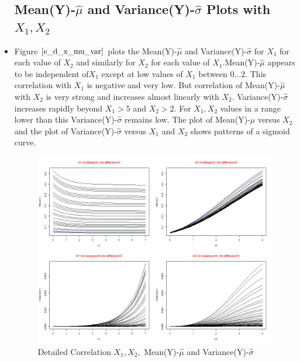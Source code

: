 \documentclass[twoside,12pt]{article}
\begin{document}
\begin{itemize}
\FloatBarrier
\subsection{Mean(Y)-$\hat{\mu}$ and Variance(Y)-$\hat{\sigma}$ Plots with $X_1,X_2$}
\item
Figure $\eqref{e_d_x_mu_var}$ plots the Mean(Y)-$\hat{\mu}$ and Variance(Y)-$\hat{\sigma}$ for $X_1$ for each value of $X_2$ and similarly for $X_2$ for each value of $X_1$.Mean(Y)-$\hat{\mu}$ appears to be independent of$X_1$ except at low values of $X_1$ between $0\dots2$. This correlation with $X_1$ is negative and very low. But correlation of  Mean(Y)-$\hat{\mu}$ with $X_2$ is very strong and increases almost linearly with $X_2$.  Variance(Y)-$\hat{\sigma}$ increases rapidly beyond  $X_1 > 5$ and $X_2 > 2$. For $X_1,X_2$ values in a range lower than this  Variance(Y)-$\hat{\sigma}$ remains low. The plot of  Mean(Y)-$\hat{\mu}$ versus $X_2$ and the plot of Variance(Y)-$\hat{\sigma}$ versus $X_1$ and $X_2$ shows patterns of a sigmoid curve.

\FloatBarrier
\begin{figure}[!htbp]
\centering
\includegraphics[scale=.50]{images/mt_scatter_detailed_plot.png} 
\caption{Detailed Correlation  $X_1, X_2,$  Mean(Y)-$\hat{\mu}$ and Variance(Y)-$\hat{\sigma}$ }
\label{e_d_x_mu_var}
\end{figure}
\FloatBarrier


\end{itemize}
\end{document}
